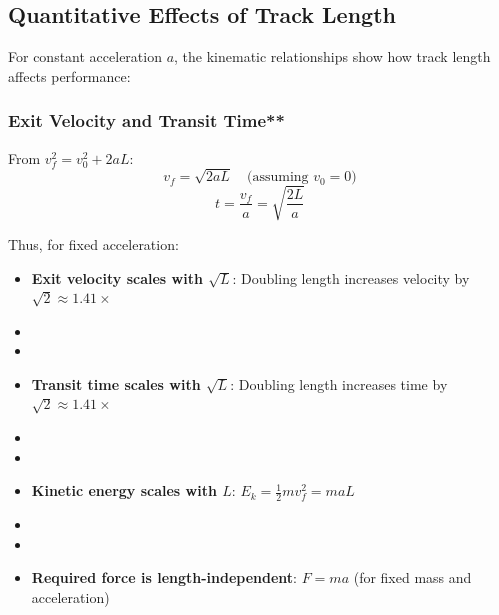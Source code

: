 \subsection{Quantitative Effects of Track Length}
For constant acceleration $a$, the kinematic relationships show how track length affects performance:

\subsubsection{Exit Velocity and Transit Time**}
From $v_f^2 = v_0^2 + 2aL$:
\begin{equation}
v_f = \sqrt{2aL} \quad \text{(assuming $v_0 = 0$)}
\end{equation}
\begin{equation}
t = \frac{v_f}{a} = \sqrt{\frac{2L}{a}}
\end{equation}

Thus, for fixed acceleration:
\begin{itemize}
    \item \textbf{Exit velocity scales with $\sqrt{L}$}: Doubling length increases velocity by $\sqrt{2} \approx 1.41\times$
    \item \item \item \textbf{Transit time scales with $\sqrt{L}$}: Doubling length increases time by $\sqrt{2} \approx 1.41\times$
    \item \item \item \textbf{Kinetic energy scales with $L$}: $E_k = \frac{1}{2}mv_f^2 = m a L$
    \item \item \item \textbf{Required force is length-independent}: $F = ma$ (for fixed mass and acceleration)
\end{itemize}

